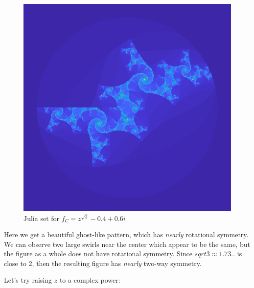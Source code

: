 \documentclass[12pt]{article}
\begin{document}
\begin{figure}[H]
	\centering
	\includegraphics[scale=0.5]{root3_0.png}
	\caption{Julia set for $f_C = z^{\sqrt{3}} - 0.4 + 0.6i$}
\end{figure}

Here we get a beautiful ghost-like pattern, which has \textit{nearly} rotational symmetry. We can observe two large swirls near the center which appear to be the same, but the figure as a whole does not have rotational symmetry. Since $sqrt{3}\approx 1.73..$ is close to 2, then the resulting figure has \textit{nearly} two-way symmetry. 

Let's try raising $z$ to a complex power:
\end{document}
